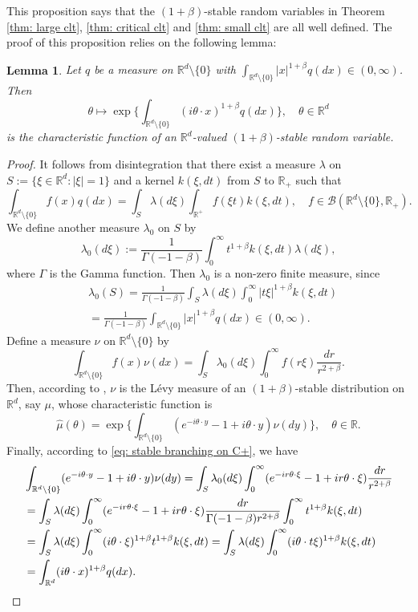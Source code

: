\documentclass[12pt,a4paper]{amsart}
\theoremstyle{plain}
\newtheorem{lem}[thm]{Lemma}
\theoremstyle{definition}
\numberwithin{equation}{section}
\begin{document}
    This proposition says that the $(1+\beta)$-stable random variables  in Theorem \ref{thm: large clt}, \ref{thm: critical clt} and \ref{thm: small clt} are all well defined.
    The proof of this proposition relies on the following lemma:
\begin{lem}
\label{lem: charactreisticfunction}
    Let $q$ be a measure on $\mathbb R^d\setminus\{0\}$ with
    $\int_{\mathbb R^d\setminus\{0\}} |x|^{1+\beta} q(dx) \in (0,\infty)$.
    Then
\[
    \theta \mapsto  \exp\Big\{\int_{\mathbb R^d\setminus\{0\}} (i\theta \cdot x)^{1+\beta} q(dx)\Big\},
    \quad \theta \in \mathbb R^d
\]
    is the characteristic function of an $\mathbb R^d$-valued $(1+\beta)$-stable random variable.
\end{lem}
\begin{proof}
    It follows from disintegration that there exist a measure $\lambda$ on $S:= \{\xi\in \mathbb R^d:|\xi| = 1\}$ and a kernel $k(\xi,dt)$ from $S$ to $\mathbb R_+$ such that
\[
    \int_{\mathbb R^d\setminus \{0\}} f(x)q(dx) = \int_S \lambda(d\xi) \int_{\mathbb R^+} f(\xi t)k(\xi,dt),\quad
    f\in \mathcal B(\mathbb R^d\setminus \{0\}, \mathbb R_+).
\]
    We define another measure $\lambda_0$ on $S$ by
\[
    \lambda_0(d\xi) := \frac1{\Gamma(-1-\beta)}\int_0^\infty t^{1+\beta}k(\xi,dt) \lambda (d\xi),
\]
        where $\Gamma$ is the Gamma function.
    Then $\lambda_0$ is a non-zero finite measure, since
\begin{align}
    &\lambda_0(S) = \frac{1}{\Gamma(-1-\beta)} \int_S \lambda (d\xi) \int_0^\infty |t\xi|^{1+\beta}k(\xi,dt)
    \\&= \frac{1}{\Gamma(-1-\beta)} \int_{\mathbb R^d\setminus\{0\}} |x|^{1+\beta} q(dx) \in (0,\infty).
\end{align}
    Define a measure $\nu$ on $\mathbb R^d\setminus\{0\}$ by
\[
    \int_{\mathbb R^d\setminus\{0\}}f(x)\nu(dx)= \int_{S} \lambda_0(d\xi) \int_0^\infty f(r\xi) \frac{dr}{r^{2+\beta}} .
\]
        Then, according to \cite[Remark 14.4]{Sato2013Levy}, $\nu$ is the L\'evy measure of an $(1+\beta)$-stable distribution on $\mathbb R^d$, say $\mu$, whose characteristic function is
\[
    \hat \mu(\theta)
    =\exp\Big\{\int_{\mathbb R^d\setminus\{0\}} (e^{-i\theta \cdot y}-1+i\theta \cdot y) \nu(dy)\Big\},
    \quad \theta \in \mathbb R.
\]
	    Finally, according to \eqref{eq: stable branching on C+}, we have
\begin{align}
    &\int_{\mathbb R^d\setminus\{0\}} (e^{-i\theta \cdot y}-1+i\theta \cdot y) \nu(dy)
    = \int_S \lambda_0(d\xi) \int_0^\infty (e^{-ir\theta \cdot \xi}-1+ir\theta \cdot \xi) \frac{dr}{r^{2+\beta}}
    \\& = \int_S \lambda (d\xi) \int_0^\infty (e^{-ir\theta \cdot \xi}-1+ir\theta \cdot \xi) \frac{dr}{\Gamma(-1-\beta)r^{2+\beta}}\int_0^\infty t^{1+\beta} k(\xi,dt)
    \\& = \int_S \lambda (d\xi) \int_0^\infty (i\theta\cdot \xi)^{1+\beta} t^{1+\beta} k(\xi,dt)
    = \int_S \lambda(d\xi) \int_0^\infty (i\theta \cdot t\xi)^{1+\beta} k(\xi,dt)
    \\& = \int_{\mathbb R^d} (i\theta \cdot x)^{1+\beta} q(dx).
    \qedhere
\end{align}
\end{proof}
\end{document}
